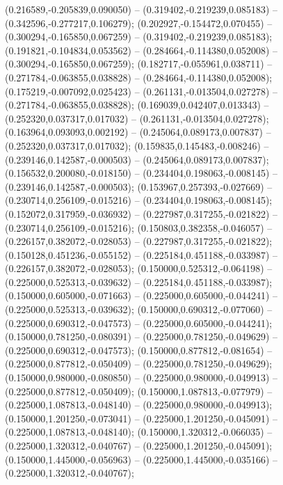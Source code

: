  (0.216589,-0.205839,0.090050) -- (0.319402,-0.219239,0.085183) -- (0.342596,-0.277217,0.106279);
 (0.202927,-0.154472,0.070455) -- (0.300294,-0.165850,0.067259) -- (0.319402,-0.219239,0.085183);
 (0.191821,-0.104834,0.053562) -- (0.284664,-0.114380,0.052008) -- (0.300294,-0.165850,0.067259);
 (0.182717,-0.055961,0.038711) -- (0.271784,-0.063855,0.038828) -- (0.284664,-0.114380,0.052008);
 (0.175219,-0.007092,0.025423) -- (0.261131,-0.013504,0.027278) -- (0.271784,-0.063855,0.038828);
 (0.169039,0.042407,0.013343) -- (0.252320,0.037317,0.017032) -- (0.261131,-0.013504,0.027278);
 (0.163964,0.093093,0.002192) -- (0.245064,0.089173,0.007837) -- (0.252320,0.037317,0.017032);
 (0.159835,0.145483,-0.008246) -- (0.239146,0.142587,-0.000503) -- (0.245064,0.089173,0.007837);
 (0.156532,0.200080,-0.018150) -- (0.234404,0.198063,-0.008145) -- (0.239146,0.142587,-0.000503);
 (0.153967,0.257393,-0.027669) -- (0.230714,0.256109,-0.015216) -- (0.234404,0.198063,-0.008145);
 (0.152072,0.317959,-0.036932) -- (0.227987,0.317255,-0.021822) -- (0.230714,0.256109,-0.015216);
 (0.150803,0.382358,-0.046057) -- (0.226157,0.382072,-0.028053) -- (0.227987,0.317255,-0.021822);
 (0.150128,0.451236,-0.055152) -- (0.225184,0.451188,-0.033987) -- (0.226157,0.382072,-0.028053);
 (0.150000,0.525312,-0.064198) -- (0.225000,0.525313,-0.039632) -- (0.225184,0.451188,-0.033987);
 (0.150000,0.605000,-0.071663) -- (0.225000,0.605000,-0.044241) -- (0.225000,0.525313,-0.039632);
 (0.150000,0.690312,-0.077060) -- (0.225000,0.690312,-0.047573) -- (0.225000,0.605000,-0.044241);
 (0.150000,0.781250,-0.080391) -- (0.225000,0.781250,-0.049629) -- (0.225000,0.690312,-0.047573);
 (0.150000,0.877812,-0.081654) -- (0.225000,0.877812,-0.050409) -- (0.225000,0.781250,-0.049629);
 (0.150000,0.980000,-0.080850) -- (0.225000,0.980000,-0.049913) -- (0.225000,0.877812,-0.050409);
 (0.150000,1.087813,-0.077979) -- (0.225000,1.087813,-0.048140) -- (0.225000,0.980000,-0.049913);
 (0.150000,1.201250,-0.073041) -- (0.225000,1.201250,-0.045091) -- (0.225000,1.087813,-0.048140);
 (0.150000,1.320312,-0.066035) -- (0.225000,1.320312,-0.040767) -- (0.225000,1.201250,-0.045091);
 (0.150000,1.445000,-0.056963) -- (0.225000,1.445000,-0.035166) -- (0.225000,1.320312,-0.040767);
